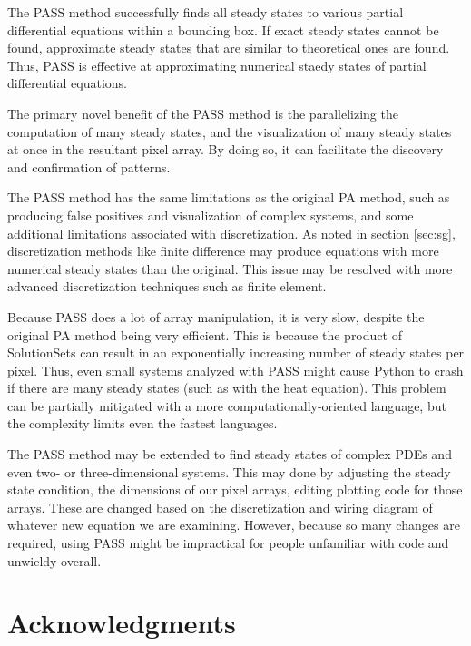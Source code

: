 \documentclass[11pt]{article}
\begin{document}
The PASS method successfully finds all steady states to various partial differential equations within a bounding box. If exact steady states cannot be found, approximate steady states that are similar to theoretical ones are found. Thus, PASS is effective at approximating numerical staedy states of partial differential equations.

The primary novel benefit of the PASS method is the parallelizing the computation of many steady states, and the visualization of many steady states at once in the resultant pixel array. By doing so, it can facilitate the discovery and confirmation of patterns.

The PASS method has the same limitations as the original PA method, such as producing false positives and visualization of complex systems, and some additional limitations associated with discretization. As noted in section \cref{sec:sg}, discretization methods like finite difference may produce equations with more numerical steady states than the original. This issue may be resolved with more advanced discretization techniques such as finite element. 

Because PASS does a lot of array manipulation, it is very slow, despite the original PA method being very efficient. This is because the product of SolutionSets can result in an exponentially increasing number of steady states per pixel. Thus, even small systems analyzed with PASS might cause Python to crash if there are many steady states (such as with the heat equation). This problem can be partially mitigated with a more computationally-oriented language, but the complexity limits even the fastest languages.

The PASS method may be extended to find steady states of complex PDEs and even two- or three-dimensional systems. This may done by adjusting the steady state condition, the dimensions of our pixel arrays, editing plotting code for those arrays. These are changed based on the discretization and wiring diagram of whatever new equation we are examining. However, because so many changes are required, using PASS might be impractical for people unfamiliar with code and unwieldy overall.

\section{Acknowledgments}

\end{document}
